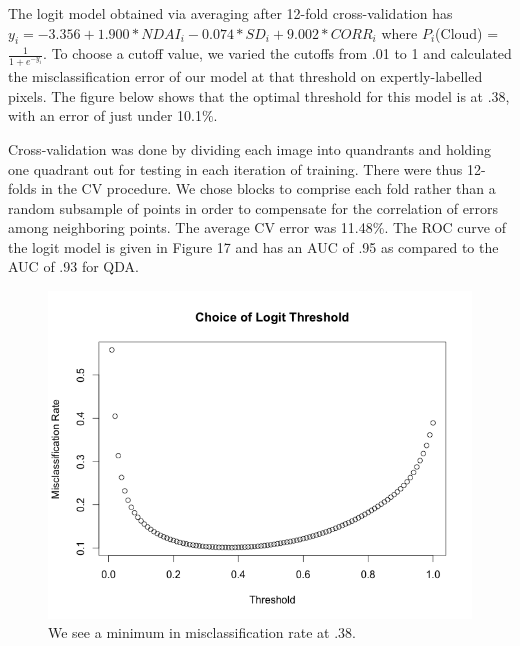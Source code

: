 \documentclass{article}\usepackage[]{graphicx}\usepackage[]{color}
\begin{document}
The logit model obtained via averaging after 12-fold cross-validation has $y_i = -3.356 + 1.900 * NDAI_i - 0.074 * SD_i + 9.002 * CORR_i$ where $P_i$(Cloud) = $ \frac{1}{1 + e^{-y_i}}$. To choose a cutoff value, we varied the cutoffs from .01 to 1 and calculated the misclassification error of our model at that threshold on expertly-labelled pixels. The figure below shows that the optimal threshold for this model is at .38, with an error of just under 10.1$\%$. 

Cross-validation was done by dividing each image into quandrants and holding one quadrant out for testing in each iteration of training. There were thus 12-folds in the CV procedure. We chose blocks to comprise each fold rather than a random subsample of points in order to compensate for the correlation of errors among neighboring points. The average CV error was 11.48$\%$. The ROC curve of the logit model is given in Figure 17 and has an AUC of .95 as compared to the AUC of .93 for QDA.

\begin{figure}[H]
\begin{center}
\includegraphics[scale = .35]{threshold.png}
\caption{We see a minimum in misclassification rate at .38.}
\end{center}
\end{figure}
\end{document}
